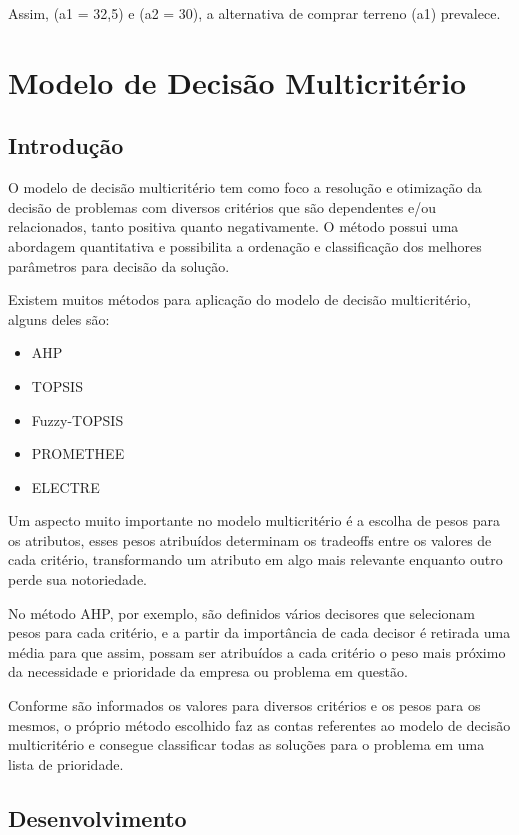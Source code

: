 \documentclass[
	12pt,				%
	openright,			%
	oneside,			%
	a4paper,			%
	english,			%
	french,				%
	spanish,			%
	brazil				%
	]{abntex2}
\begin{document}
Assim, (a1 = 32,5) e (a2 = 30), a alternativa de comprar terreno (a1) prevalece. \cite{modelagem}


\part{Modelo de Decisão Multicritério}

\chapter{Introdução}

O modelo de decisão multicritério tem como foco a resolução e otimização da decisão de problemas com diversos critérios que são dependentes e/ou relacionados, tanto positiva quanto negativamente. O método possui uma abordagem quantitativa e possibilita a ordenação e classificação dos melhores parâmetros para decisão da solução. \cite{dealmeida}

Existem muitos métodos para aplicação do modelo de decisão multicritério, alguns deles são:

\begin{itemize}
\item AHP 
\item TOPSIS 
\item Fuzzy-TOPSIS 
\item PROMETHEE 
\item ELECTRE
\end{itemize}

Um aspecto muito importante no modelo multicritério é a escolha de pesos para os atributos, esses pesos atribuídos determinam os tradeoffs entre os valores de cada critério, transformando um atributo em algo mais relevante enquanto outro perde sua notoriedade. \cite{van}

No método AHP, por exemplo, são definidos vários decisores que selecionam pesos para cada critério, e a partir da importância de cada decisor é retirada uma média para que assim, possam ser atribuídos a cada critério o peso mais próximo da necessidade e prioridade da empresa ou problema em questão.

Conforme são informados os valores para diversos critérios e os pesos para os mesmos, o próprio método escolhido faz as contas referentes ao modelo de decisão multicritério e consegue classificar todas as soluções para o problema em uma lista de prioridade.


\chapter{Desenvolvimento}
\end{document}
